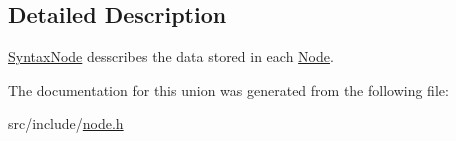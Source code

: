 \subsection{Detailed Description}
\mbox{\hyperlink{union_syntax_node}{Syntax\+Node}} desscribes the data stored in each \mbox{\hyperlink{struct_node}{Node}}. 

The documentation for this union was generated from the following file\+:\begin{DoxyCompactItemize}
\item 
src/include/\mbox{\hyperlink{node_8h}{node.\+h}}\end{DoxyCompactItemize}
